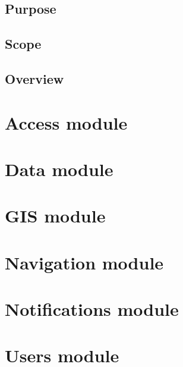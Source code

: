 \documentclass{article}
\begin{document}
		\subsection{Purpose}\label{sec:intro-purpose}
		
		\subsection{Scope}\label{sec:intro-scope}
		
		\subsection{Overview}\label{sec:intro-overview}
	
		
	\clearpage
		
	\section{Access module}\label{sec:access}

		
		
	\clearpage

	\section{Data module}\label{sec:data}
	
		

	\clearpage
	
	\section{GIS module}\label{sec:gis}
	
			

	\clearpage
	
	\section{Navigation module}\label{sec:navigation}
	
	
	
	\clearpage
	
	\section{Notifications module}\label{sec:notification}
	
	
	
	\clearpage
	
	\section{Users module}\label{sec:users}
	
	
\end{document}
